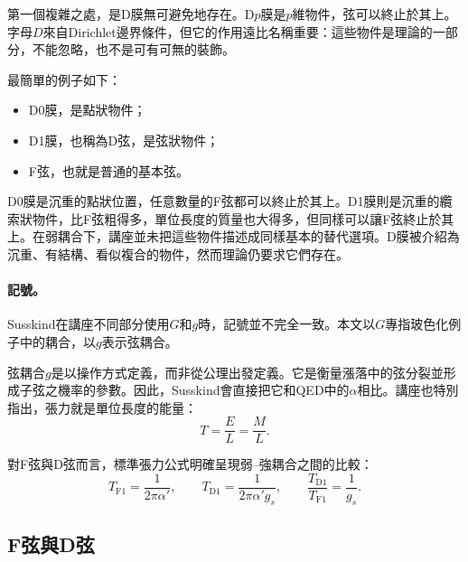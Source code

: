 第一個複雜之處，是D膜無可避免地存在。D\(p\)膜是\(p\)維物件，弦可以終止於其上。字母\(D\)來自Dirichlet邊界條件，但它的作用遠比名稱重要：這些物件是理論的一部分，不能忽略，也不是可有可無的裝飾。

最簡單的例子如下：
\begin{itemize}
\item D0膜，是點狀物件；
\item D1膜，也稱為D弦，是弦狀物件；
\item F弦，也就是普通的基本弦。
\end{itemize}
D0膜是沉重的點狀位置，任意數量的F弦都可以終止於其上。D1膜則是沉重的纜索狀物件，比F弦粗得多，單位長度的質量也大得多，但同樣可以讓F弦終止於其上。在弱耦合下，講座並未把這些物件描述成同樣基本的替代選項。D膜被介紹為沉重、有結構、看似複合的物件，然而理論仍要求它們存在。


\paragraph{記號。}
Susskind在講座不同部分使用\(G\)和\(g\)時，記號並不完全一致。本文以\(G\)專指玻色化例子中的耦合，以\(g\)表示弦耦合。

弦耦合\(g\)是以操作方式定義，而非從公理出發定義。它是衡量漲落中的弦分裂並形成子弦之機率的參數。因此，Susskind會直接把它和QED中的\(\alpha\)相比。講座也特別指出，張力就是單位長度的能量：
\begin{equation}
T=\frac{E}{L}=\frac{M}{L}.
\end{equation}

對F弦與D弦而言，標準張力公式明確呈現弱--強耦合之間的比較：
\begin{equation}
T_{\mathrm{F1}}=\frac{1}{2\pi\alpha'},
\qquad
T_{\mathrm{D1}}=\frac{1}{2\pi\alpha' g_s},
\qquad
\frac{T_{\mathrm{D1}}}{T_{\mathrm{F1}}}=\frac{1}{g_s}.
\end{equation}

\subsection{F弦與D弦}

